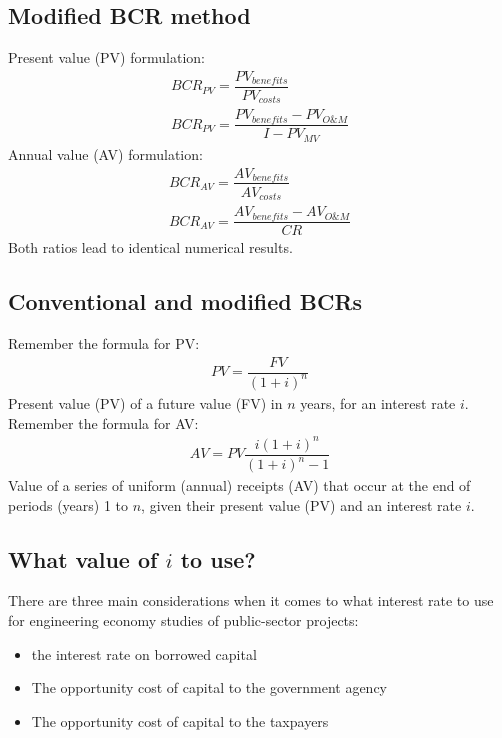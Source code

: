 \subsection{Modified BCR method}
Present value (PV) formulation:
\begin{gather}
  BCR_{PV} = \dfrac{PV_{benefits}}{PV_{costs}}\\
  BCR_{PV} = \dfrac{PV_{benefits} - PV_{O\&M}}{I - PV_{MV}}
\end{gather}
Annual value (AV) formulation:
\begin{gather}
  BCR_{AV} = \dfrac{AV_{benefits}}{AV_{costs}}\\
  BCR_{AV} = \dfrac{AV_{benefits}-AV_{O\&M}}{CR}
\end{gather}
Both ratios lead to identical numerical results.
\subsection{Conventional and modified BCRs}
Remember the formula for PV:
\begin{gather}
  PV = \dfrac{FV}{(1+i)^n}
\end{gather}
Present value (PV) of a future value (FV) in $n$ years, for an interest rate $i$.
Remember the formula for AV:
\begin{gather}
  AV = PV\dfrac{i(1+i)^n}{(1+i)^n - 1}
\end{gather}
Value of a series of uniform (annual) receipts (AV) that occur at the end of periods (years) 1 to $n$, given their present value (PV) and an interest rate $i$.
\subsection{What value of $i$ to use?}
There are three main considerations when it comes to what interest rate to use for engineering economy studies of public-sector projects:
\begin{itemize}
  \item the interest rate on borrowed capital
  \item The opportunity cost of capital to the government agency
  \item The opportunity cost of capital to the taxpayers
\end{itemize}
